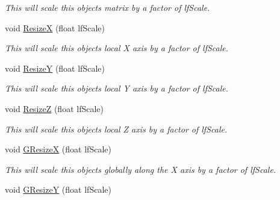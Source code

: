 \begin{DoxyCompactItemize}
\begin{DoxyCompactList}\small\item\em This will scale this objects matrix by a factor of lfScale. \end{DoxyCompactList}\item 
\hypertarget{classc_camera_matrix4_ab5ec9054a71a9df7bb671829875600f2}{
void \hyperlink{classc_camera_matrix4_ab5ec9054a71a9df7bb671829875600f2}{ResizeX} (float lfScale)}
\label{classc_camera_matrix4_ab5ec9054a71a9df7bb671829875600f2}

\begin{DoxyCompactList}\small\item\em This will scale this objects local X axis by a factor of lfScale. \end{DoxyCompactList}\item 
\hypertarget{classc_camera_matrix4_a44507dbaa203a79c420d9ceef985e186}{
void \hyperlink{classc_camera_matrix4_a44507dbaa203a79c420d9ceef985e186}{ResizeY} (float lfScale)}
\label{classc_camera_matrix4_a44507dbaa203a79c420d9ceef985e186}

\begin{DoxyCompactList}\small\item\em This will scale this objects local Y axis by a factor of lfScale. \end{DoxyCompactList}\item 
\hypertarget{classc_camera_matrix4_a6c4d89f66c5b6568b5f334c3ab4a7414}{
void \hyperlink{classc_camera_matrix4_a6c4d89f66c5b6568b5f334c3ab4a7414}{ResizeZ} (float lfScale)}
\label{classc_camera_matrix4_a6c4d89f66c5b6568b5f334c3ab4a7414}

\begin{DoxyCompactList}\small\item\em This will scale this objects local Z axis by a factor of lfScale. \end{DoxyCompactList}\item 
\hypertarget{classc_camera_matrix4_a9984a8427cd90e77a2fb6462ecf99ecc}{
void \hyperlink{classc_camera_matrix4_a9984a8427cd90e77a2fb6462ecf99ecc}{GResizeX} (float lfScale)}
\label{classc_camera_matrix4_a9984a8427cd90e77a2fb6462ecf99ecc}

\begin{DoxyCompactList}\small\item\em This will scale this objects globally along the X axis by a factor of lfScale. \end{DoxyCompactList}\item 
\hypertarget{classc_camera_matrix4_aa2a9326b7f2a6f00aa5b45057c69ecd3}{
void \hyperlink{classc_camera_matrix4_aa2a9326b7f2a6f00aa5b45057c69ecd3}{GResizeY} (float lfScale)}
\label{classc_camera_matrix4_aa2a9326b7f2a6f00aa5b45057c69ecd3}


\end{DoxyCompactItemize}
